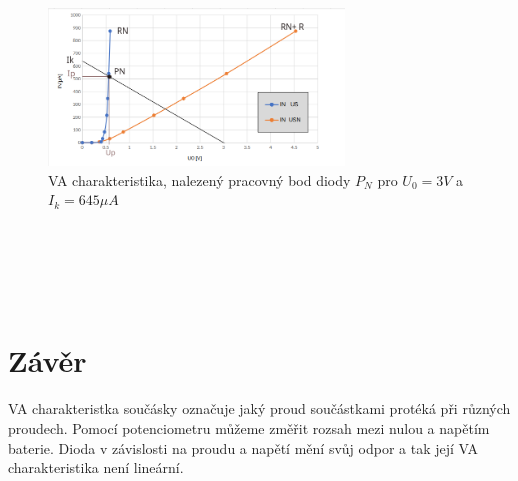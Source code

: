 \documentclass[11pt,a4paper,titlepage]{article}
\begin{document}
\begin{center}
    \begin{figure}[h]
            \centering
            \includegraphics[width=0.7\textwidth]{./graf_Image}
            \captionsetup{labelformat=empty}
            \caption{VA charakteristika, nalezený pracovný bod diody  $P_{N}$ pro $U_{0} = 3V$ a $I_{k} = 645 \mu A$}
    \end{figure}
\end{center}
 \\ \\\ \\ \\
\section{Závěr}
VA charakteristka součásky označuje jaký proud součástkami protéká při různých proudech.
Pomocí potenciometru můžeme změřit rozsah mezi nulou a napětím baterie.
Dioda v závislosti na proudu a napětí mění svůj odpor a tak její VA charakteristika není lineární.
\end{document}
